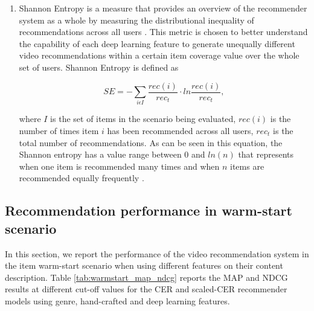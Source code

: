 \documentclass[review]{elsarticle}
\begin{document}
\begin{enumerate}
    
    \item Shannon Entropy is a measure that provides an overview of the recommender system as a whole by measuring the distributional inequality of recommendations across all users \citep{deldjoo2019movie}. This metric is chosen to better understand the capability of each deep learning feature to generate unequally different video recommendations within a certain item coverage value over the whole set of users. Shannon Entropy is defined as \citep{deldjoo2019movie}
    
    \begin{equation}
        SE = -\sum_{i\epsilon I}\frac{rec(i)}{rec_t} \cdot ln\frac{rec(i)}{rec_t},
        \label{entropy}
    \end{equation} 
 
 
 
    where $I$ is the set of items in the scenario being evaluated, $rec(i)$ is the number of times item $i$ has been recommended across all users, $rec_t$ is the total number of recommendations. As can be seen in this equation, the Shannon entropy has a value range between $0$ and $ln(n)$ that represents when one item is recommended many times and when $n$ items are recommended equally frequently \citep{shani2011evaluating}.    
    
    
\end{enumerate}




\subsection{Recommendation performance in warm-start scenario}
In this section, we report the performance of the video recommendation system in the item warm-start scenario when using different features on their content description. Table \ref{tab:warmstart_map_ndcg} reports the MAP and NDCG results at different cut-off values for the CER and scaled-CER recommender models using genre, hand-crafted and deep learning features. 
\end{document}
